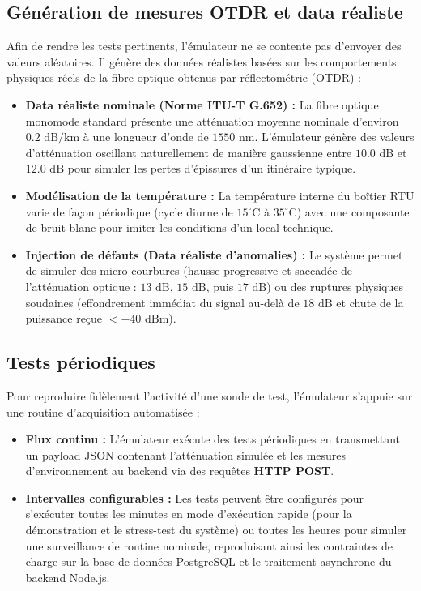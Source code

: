 \documentclass[11pt,a4paper]{article}
\begin{document}
\subsection{Génération de mesures OTDR et data réaliste}
Afin de rendre les tests pertinents, l'émulateur ne se contente pas d'envoyer des valeurs aléatoires. Il génère des données réalistes basées sur les comportements physiques réels de la fibre optique obtenus par réflectométrie (OTDR) :
\begin{itemize}
    \item \textbf{Data réaliste nominale (Norme ITU-T G.652) :} La fibre optique monomode standard présente une atténuation moyenne nominale d'environ $0.2\text{ dB/km}$ à une longueur d'onde de $1550\text{ nm}$. L'émulateur génère des valeurs d'atténuation oscillant naturellement de manière gaussienne entre $10.0\text{ dB}$ et $12.0\text{ dB}$ pour simuler les pertes d'épissures d'un itinéraire typique.
    \item \textbf{Modélisation de la température :} La température interne du boîtier RTU varie de façon périodique (cycle diurne de $15^\circ\text{C}$ à $35^\circ\text{C}$) avec une composante de bruit blanc pour imiter les conditions d'un local technique.
    \item \textbf{Injection de défauts (Data réaliste d'anomalies) :} Le système permet de simuler des micro-courbures (hausse progressive et saccadée de l'atténuation optique : $13\text{ dB}$, $15\text{ dB}$, puis $17\text{ dB}$) ou des ruptures physiques soudaines (effondrement immédiat du signal au-delà de $18\text{ dB}$ et chute de la puissance reçue $< -40\text{ dBm}$).
\end{itemize}

\subsection{Tests périodiques}
Pour reproduire fidèlement l'activité d'une sonde de test, l'émulateur s'appuie sur une routine d'acquisition automatisée :
\begin{itemize}
    \item \textbf{Flux continu :} L'émulateur exécute des tests périodiques en transmettant un payload JSON contenant l'atténuation simulée et les mesures d'environnement au backend via des requêtes \textbf{HTTP POST}.
    \item \textbf{Intervalles configurables :} Les tests peuvent être configurés pour s'exécuter toutes les minutes en mode d'exécution rapide (pour la démonstration et le stress-test du système) ou toutes les heures pour simuler une surveillance de routine nominale, reproduisant ainsi les contraintes de charge sur la base de données PostgreSQL et le traitement asynchrone du backend Node.js.
\end{itemize}
\end{document}
